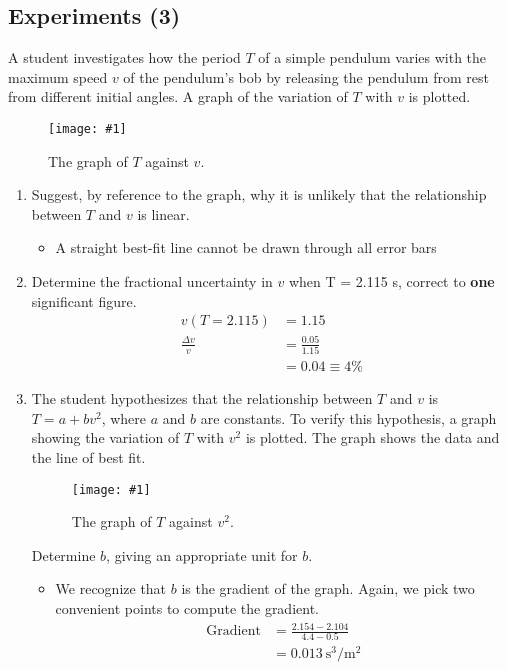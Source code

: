 \documentclass[a4paper,12pt]{article}
\let\oldsubsection\subsection
\renewcommand\subsection{\clearpage\oldsubsection}
\newcommand{\img}[4]{\begin{center}
  \begin{figure}[H]
    \centering
    \texttt{[image: \#1]}
    \caption{#3}
    \label{fig:#4}
  \end{figure}
\end{center}}
\begin{document}
\subsection{Experiments (3)}

A student investigates how the period \( T \) of a simple pendulum varies with the maximum speed \( v \) of the pendulum's bob by releasing the pendulum from rest from different initial angles. A graph of the variation of \( T \) with \( v \) is plotted.

\img{ex/9.png}{0.7}{The graph of $T$ against $v$.}{9}

\begin{enumerate}[label=(\alph*)]
  \item Suggest, by reference to the graph, why it is unlikely that the relationship between $T$ and $v$ is linear.
        \begin{itemize}
          \item A straight best-fit line cannot be drawn through all error bars
        \end{itemize}
  \item Determine the fractional uncertainty in $v$ when T = 2.115 s, correct to \textbf{one} significant figure.
        \begin{align*}
          v(T = 2.115)       & = 1.15              \\
          \frac{\Delta v}{v} & = \frac{0.05}{1.15} \\
                             & = 0.04 \equiv 4\%
        \end{align*}
  \item The student hypothesizes that the relationship between \( T \) and \( v \) is \( T = a + bv^2 \), where \( a \) and \( b \) are constants. To verify this hypothesis, a graph showing the variation of \( T \) with \( v^2 \) is plotted. The graph shows the data and the line of best fit.
        \img{ex/10.png}{1}{The graph of $T$ against $v^2$.}{10}
        Determine $b$, giving an appropriate unit for $b$.
        \begin{itemize}
          \item We recognize that $b$ is the gradient of the graph. Again, we pick two convenient points to compute the gradient.
                \begin{align*}
                  \text{Gradient} & = \frac{2.154 - 2.104}{4.4 - 0.5}    \\
                                  & = \SI{0.013}{\s\cubed\per\m\squared}
                \end{align*}

\end{itemize}
\end{enumerate}
\end{document}
